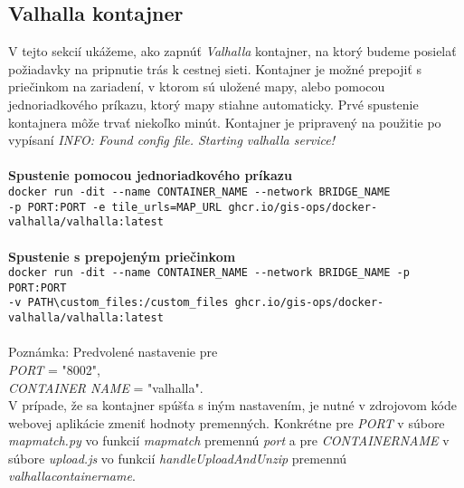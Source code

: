 \subsection{Valhalla kontajner}
V tejto sekcií ukážeme, ako zapnúť \textit{Valhalla} kontajner, na ktorý budeme posielať požiadavky na pripnutie trás k cestnej sieti. Kontajner je možné prepojiť s priečinkom na zariadení, v ktorom sú uložené mapy, alebo pomocou jednoriadkového príkazu, ktorý mapy stiahne automaticky. Prvé spustenie kontajnera môže trvať niekoľko minút. Kontajner je pripravený na použitie po vypísaní \textit{INFO: Found config file. Starting valhalla service!} \\\\
\textbf{Spustenie pomocou jednoriadkového príkazu}\\
\indent \verb|docker run -dit --name CONTAINER_NAME --network BRIDGE_NAME|\\
\indent \verb|-p PORT:PORT -e tile_urls=MAP_URL ghcr.io/gis-ops/docker-valhalla/valhalla:latest|\\\\
\textbf{Spustenie s prepojeným priečinkom}\\
\indent \verb|docker run -dit --name CONTAINER_NAME --network BRIDGE_NAME -p PORT:PORT |\\
\indent \verb|-v PATH\custom_files:/custom_files ghcr.io/gis-ops/docker-valhalla/valhalla:latest|\\\\

\noindent Poznámka: Predvolené nastavenie pre \\
\textit{PORT} = "8002", \\
\textit{CONTAINER \textunderscore NAME} = "valhalla". \\
V prípade, že sa kontajner spúšťa s iným nastavením, je nutné v zdrojovom kóde webovej aplikácie zmeniť hodnoty premenných. Konkrétne pre \textit{PORT} v súbore \textit{map\textunderscore match.py} vo funkcií \textit{map\textunderscore match} premennú \textit{port} a pre \textit{CONTAINER\textunderscore NAME} v súbore \textit{upload.js} vo funkcií \textit{handleUploadAndUnzip} premennú \textit{valhalla\textunderscore container\textunderscore name}. 